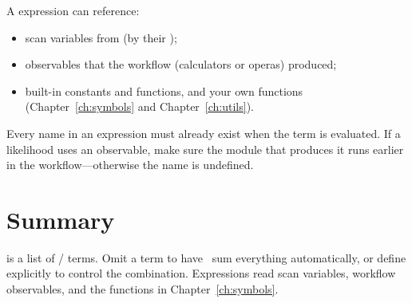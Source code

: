 A  expression can reference:

\begin{itemize}
  \item scan variables from  (by their );
  \item observables that the workflow (calculators or operas) produced;
  \item built-in constants and functions, and your own  functions
        (Chapter~\ref{ch:symbols} and Chapter~\ref{ch:utils}).
\end{itemize}

\begin{jwarn}
Every name in an expression must already exist when the term is evaluated. If a likelihood uses
an observable, make sure the module that produces it runs earlier in the workflow---otherwise the
name is undefined.
\end{jwarn}

\section{Summary}
\label{sec:logl-summary}

 is a list of / terms. Omit a
 term to have \Jarvis\ sum everything automatically, or define 
explicitly to control the combination. Expressions read scan variables, workflow observables, and
the functions in Chapter~\ref{ch:symbols}.
